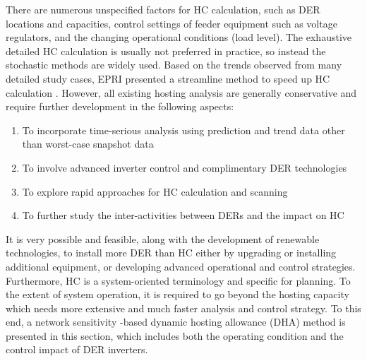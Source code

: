 \documentclass{article}
\begin{document}
There are numerous unspecified factors for HC calculation, such as DER locations and capacities, control settings of feeder equipment such as voltage regulators, and the changing operational conditions (load level). The exhaustive detailed HC calculation is usually not preferred in practice, so instead the stochastic methods are widely used. Based on the trends observed from many detailed study cases, EPRI presented a streamline method to speed up HC calculation \cite{rylander2015streamlined}. However, all existing hosting analysis are generally conservative and require further development in the following aspects: 
\begin{enumerate}[label=$-$]
    \item To incorporate time-serious analysis using prediction and trend data other than worst-case snapshot data
    \item To involve advanced inverter control and complimentary DER technologies
    \item To explore rapid approaches for HC calculation and scanning
    \item To further study the inter-activities between DERs and the impact on HC
\end{enumerate}

It is very possible and feasible, along with the development of renewable technologies, to install more DER than HC either by upgrading or installing additional
equipment, or developing advanced operational and control strategies. 
Furthermore, HC is a system-oriented terminology and specific for planning. 
To the extent of system operation, it is required to go beyond the hosting capacity which needs more extensive and much faster
analysis and control strategy.
To this end, a network sensitivity -based dynamic hosting allowance (DHA) method is presented in this section, which includes both the operating condition and the control impact of DER inverters.
\end{document}
